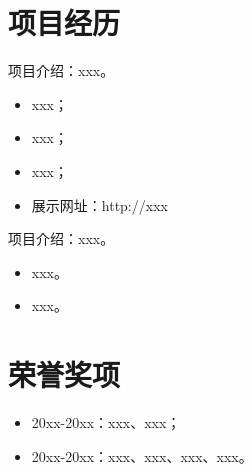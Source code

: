 \documentclass{resume}
\begin{document}
\section{项目经历}
项目介绍：xxx。
\begin{itemize}
\item xxx；
\item xxx；
\item xxx；
\item 展示网址：http://xxx
\end{itemize}
\smallskip

项目介绍：xxx。
\begin{itemize}
\item xxx。
\item xxx。
\end{itemize}
\smallskip




\section{荣誉奖项}
\begin{itemize}
\item 20xx-20xx：xxx、xxx；
\item 20xx-20xx：xxx、xxx、xxx、xxx。
\end{itemize}
\smallskip
\end{document}
